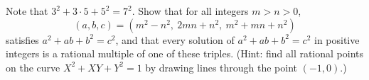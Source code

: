 Note that $3^2+3\cdot5+5^2=7^2$. Show that for all integers $m>n>0$,
\[
(a,b,c)=\left(m^2-n^2,\ 2mn+n^2,\ m^2+mn+n^2\right)
\]
satisfies $a^2+ab+b^2=c^2$, and that every solution of $a^2+ab+b^2=c^2$ in positive integers is a rational multiple of one of these triples. (Hint: find all rational points on the curve $X^2+XY+Y^2=1$ by drawing lines through the point $(-1,0)$.)
